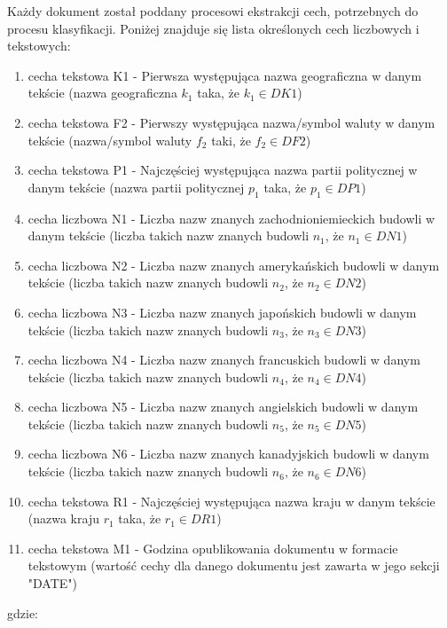 \documentclass{classrep}
\begin{document}
Każdy dokument został poddany procesowi ekstrakcji cech, potrzebnych do procesu klasyfikacji.
Poniżej znajduje się lista określonych cech liczbowych i tekstowych:
\begin{enumerate}
\item cecha tekstowa K1 - Pierwsza występująca nazwa geograficzna w danym tekście (nazwa geograficzna $k_1$ taka, że $k_1 \in DK1$)
\item cecha tekstowa F2 - Pierwszy występująca nazwa/symbol waluty w danym tekście (nazwa/symbol waluty $f_2$ taki, że $f_2 \in DF2$)
\item cecha tekstowa P1 - Najczęściej występująca nazwa partii politycznej w danym tekście (nazwa partii politycznej $p_1$ taka, że $p_1 \in DP1$)
\item cecha liczbowa N1 - Liczba nazw znanych zachodnioniemieckich budowli w danym tekście (liczba takich nazw znanych budowli $n_1$, że $n_1 \in DN1$)
\item cecha liczbowa N2 - Liczba nazw znanych amerykańskich budowli w danym tekście (liczba takich nazw znanych budowli $n_2$, że $n_2 \in DN2$)
\item cecha liczbowa N3 - Liczba nazw znanych japońskich budowli w danym tekście (liczba takich nazw znanych budowli $n_3$, że $n_3 \in DN3$)
\item cecha liczbowa N4 - Liczba nazw znanych francuskich budowli w danym tekście (liczba takich nazw znanych budowli $n_4$, że $n_4 \in DN4$)
\item cecha liczbowa N5 - Liczba nazw znanych angielskich budowli w danym tekście (liczba takich nazw znanych budowli $n_5$, że $n_5 \in DN5$)
\item cecha liczbowa N6 - Liczba nazw znanych kanadyjskich budowli w danym tekście (liczba takich nazw znanych budowli $n_6$, że $n_6 \in DN6$)
\item cecha tekstowa R1 - Najczęściej występująca nazwa kraju w danym tekście (nazwa kraju $r_1$ taka, że $r_1 \in DR1$)
\item cecha tekstowa M1 - Godzina opublikowania dokumentu w formacie tekstowym (wartość cechy dla danego dokumentu jest zawarta w jego sekcji "DATE")
\end{enumerate}
gdzie:
\end{document}
